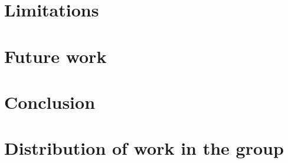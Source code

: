 \documentclass{article}
\begin{document}
\section*{Limitations}
\section*{Future work}
\section*{Conclusion}
\section*{Distribution of work in the group}
\end{document}
